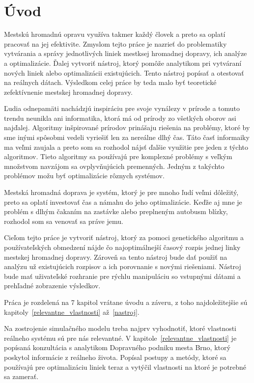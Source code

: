 \chapter{Úvod}\label{uvod}

Mestskú hromadnú opravu využíva takmer každý človek a preto sa oplatí pracovať na jej efektivite.
Zmyslom tejto práce je nazrieť do problematiky vytvárania a správy jednotlivých liniek mestksej hromadnej dopravy, ich analýze a optimalizácie.
Ďalej vytvoriť nástroj, ktorý pomôže analytikom pri vytváraní nových liniek alebo optimalizácii existujúcich.
Tento nástroj popísať a otestovať na reálnych dátach.
Výsledkom celej práce by teda malo byť teoretické zefektívnenie mestskej hromadnej dopravy.

Ľudia odnepamäti nachádzjú inspiráciu pre svoje vynálezy v prírode a tomuto trendu neunikla ani informatika, ktorá má od prírody zo všetkých oborov asi najďalej.
Algoritmy inšpirované prírodov prinášaju riešenia na problémy, ktoré by sme inými spôsobmi vedeli vyriešiť len za nereálne dlhý čas.
Táto časť informaiky ma veľmi zaujala a preto som sa rozhodol nájsť ďalšie využitie pre jeden z týchto algoritmov.
Tieto algoritmy sa používajú pre komplexné problémy s veľkým množstvom navzájom sa ovplyvňujúcich premenných.
Jedným z takýchto problémov možu byť optimalizácie rôznych systémov.

Mestská hromadná doprava je systém, ktorý je pre mnoho ľudí veľmi dôležitý, preto sa oplatí investovať čas a námahu do jeho optimalizácie.
Keďže aj mne je problém s dlhým čakaním na zastávke alebo preplneným autobusm blízky, rozhodol som sa venovať sa práve jemu.

Cieľom tejto práce je vytvoriť nástroj, ktorý za pomoci genetického algoritmu a používateľských obmedzení nájde čo najoptimálnejší časový rozpis jednej linky mestskej hromadnej dopravy.
Zároveň sa tento nástroj bude dať použiť na analýzu už existujúcich rozpisov a ich porovnanie s novými riešeniami.
Nástroj bude mať uživateľské rozhranie pre rýchlu manipuláciu so vstupnými dátami a prehľadné zobrazenie výsledkov.

Práca je rozdelená na 7 kapitol vrátane úvodu a záveru, z toho najdoležitejšie sú kapitoly~\ref{relevantne_vlastnosti} až~\ref{nastroj}.

Na zostrojenie simulačného modelu treba najprv vyhodnotiť, ktoré vlastnosti reálneho systému sú pre nás relevantné.
V kapitole~\ref{relevantne_vlastnosti} je popísaná konzultácia s analytikom Dopravného podniku mesta Brno, ktorý poskytol informácie z reálneho života.
Popísal postupy a metódy, ktoré sa používajú pre optimalizáciu liniek teraz a vytýčil vlastnosti na ktoré je potrebné sa zamerať. 

